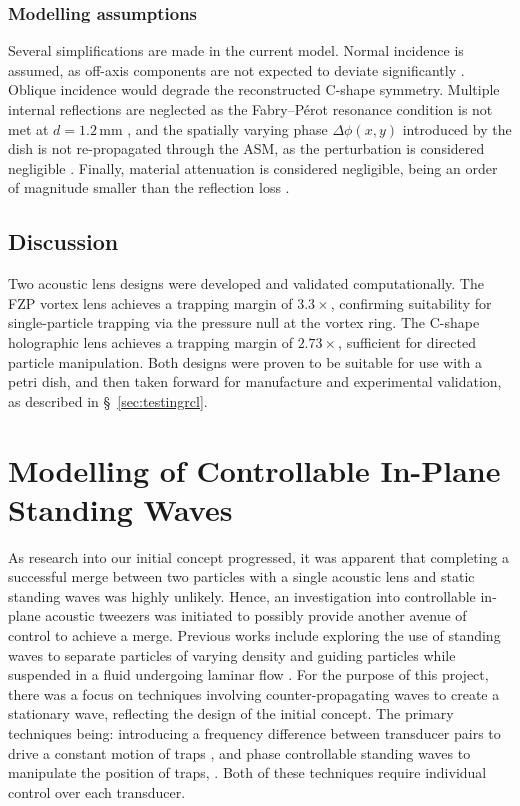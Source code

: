 \documentclass[11pt,a4paper]{article}
\begin{document}
\subsubsection{Modelling assumptions}

Several simplifications are made in the current model. Normal incidence is assumed, as off-axis components are not expected to deviate significantly \cite{kinsler2000acoustics}. Oblique incidence would degrade the reconstructed C-shape symmetry. Multiple internal reflections are neglected as the Fabry--P\'{e}rot resonance condition is not met at $d = 1.2$\,mm \cite{kinsler2000acoustics}, and the spatially varying phase $\Delta\phi(x,y)$ introduced by the dish is not re-propagated through the ASM, as the perturbation is considered negligible \cite{zeng2008angular}. Finally, material attenuation is considered negligible, being an order of magnitude smaller than the reflection loss \cite{kinsler2000acoustics}. 

\subsection{Discussion}


Two acoustic lens designs were developed and validated computationally. The FZP vortex lens achieves a trapping margin of $3.3\times$, confirming suitability for single-particle trapping via the pressure null at the vortex ring. The C-shape holographic lens achieves a trapping margin of $2.73\times$, sufficient for directed particle manipulation. Both designs were proven to be suitable for use with a petri dish, and then taken forward for manufacture and experimental validation, as described in \S~\ref{sec:testingrcl}. 

\section{Modelling of Controllable In-Plane Standing Waves}
\label{controllable In-Plane}

As research into our initial concept progressed, it was apparent that completing a successful merge between two particles with a single acoustic lens and static standing waves was highly unlikely. Hence, an investigation into controllable in-plane acoustic tweezers was initiated to possibly provide another avenue of control to achieve a merge. Previous works include exploring the use of standing waves to separate particles of varying density \cite{Luo2018PhaseReview} and guiding particles while suspended in a fluid undergoing laminar flow \cite{Kim1995CiteAl}. For the purpose of this project, there was a focus on techniques involving counter-propagating waves to create a stationary wave, reflecting the design of the initial concept. The primary techniques being: introducing a frequency difference between transducer pairs to drive a constant motion of traps \cite{Xu2026Velocity-controlledManipulation}, and phase controllable standing waves to manipulate the position of traps, \cite{Courtney2012ManipulationWaves}. Both of these techniques require individual control over each transducer.
\end{document}
